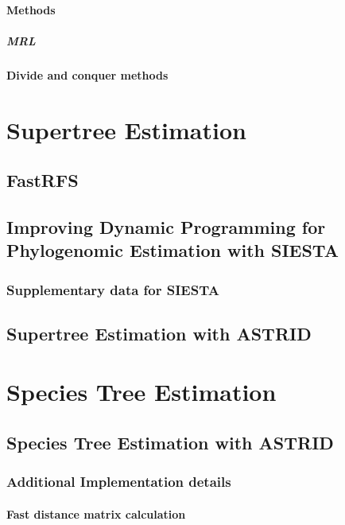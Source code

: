 \documentclass[edeposit,fullpage]{uiucthesis2014}
\theoremstyle{definition}
\begin{document}
\subsection{Methods}
\subsubsection{MRL}
\subsection{Divide and conquer methods}

\part{Supertree Estimation}
\chapter{FastRFS}


\chapter{Improving Dynamic Programming for Phylogenomic Estimation with SIESTA}

\section{Supplementary data for SIESTA}


\chapter{Supertree Estimation with ASTRID}





\part{Species Tree Estimation}
\chapter{Species Tree Estimation with ASTRID}

\section{Additional Implementation details}
\subsection{Fast distance matrix calculation}
\end{document}
